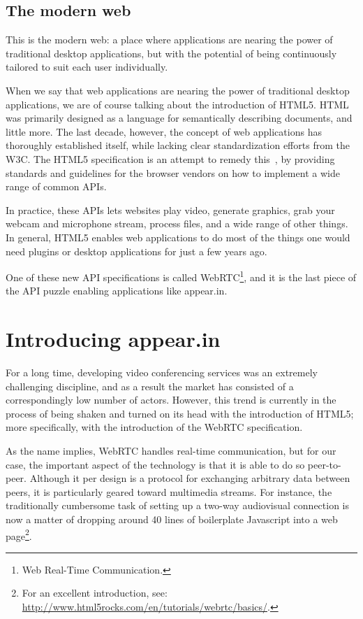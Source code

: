 \subsection{The modern web}

This is the modern web: a place where applications are nearing the power of traditional desktop applications, but with the potential of being continuously tailored to suit each user individually.

When we say that web applications are nearing the power of traditional desktop applications, we are of course talking about the introduction of HTML5. HTML was primarily designed as a language for semantically describing documents, and little more. The last decade, however, the concept of web applications has thoroughly established itself, while lacking clear standardization efforts from the W3C. The HTML5 specification is an attempt to remedy this~\cite{W3CHTML5_intro}, by providing standards and guidelines for the browser vendors on how to implement a wide range of common APIs.

In practice, these APIs lets websites play video, generate graphics, grab your webcam and microphone stream, process files, and a wide range of other things. In general, HTML5 enables web applications to do most of the things one would need plugins or desktop applications for just a few years ago.

One of these new API specifications is called WebRTC\footnote{Web Real-Time Communication.}, and it is the last piece of the API puzzle enabling applications like appear.in.

\section{Introducing appear.in}
\label{sec:appearin_intro}

For a long time, developing video conferencing services was an extremely challenging discipline, and as a result the market has consisted of a correspondingly low number of actors. However, this trend is currently in the process of being shaken and turned on its head with the introduction of HTML5; more specifically, with the introduction of the WebRTC specification.

As the name implies, WebRTC handles real-time communication, but for our case, the important aspect of the technology is that it is able to do so peer-to-peer. Although it per design is a protocol for exchanging arbitrary data between peers, it is particularly geared toward multimedia streams. For instance, the traditionally cumbersome task of setting up a two-way audiovisual connection is now a matter of dropping around 40 lines of boilerplate Javascript into a web page\footnote{For an excellent introduction, see: \url{http://www.html5rocks.com/en/tutorials/webrtc/basics/}.}.

